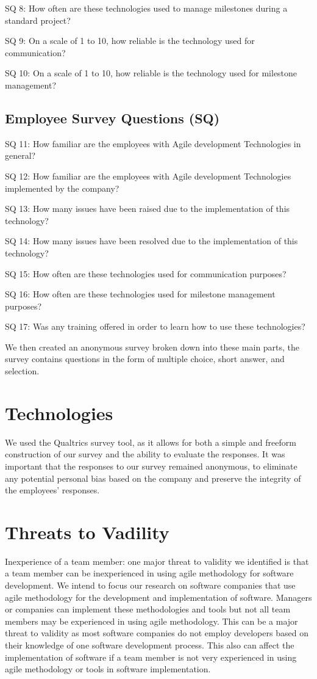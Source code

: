 \documentclass[conference]{IEEEtran}
\begin{document}
SQ 8: How often are these technologies used to manage milestones during a standard project? 

SQ 9: On a scale of 1 to 10, how reliable is the technology used for communication? 

SQ 10: On a scale of 1 to 10, how reliable is the technology used for milestone management? 


\subsection*{Employee Survey Questions (SQ)  }
SQ 11: How familiar are the employees with Agile development Technologies in general? 

SQ 12: How familiar are the employees with Agile development Technologies implemented by the company? 

SQ 13: How many issues have been raised due to the implementation of this technology? 

SQ 14: How many issues have been resolved due to the implementation of this technology? 

SQ 15: How often are these technologies used for communication purposes? 

SQ 16: How often are these technologies used for milestone management purposes? 

SQ 17: Was any training offered in order to learn how to use these technologies?


 

We then created an anonymous survey broken down into these main parts, the survey contains questions in the form of multiple choice, short answer, and selection.  

\section{Technologies}
We used the Qualtrics survey tool, as it allows for both a simple and freeform construction of our survey and the ability to evaluate the responses. It was important that the responses to our survey remained anonymous, to eliminate any potential personal bias based on the company and preserve the integrity of the employees' responses. 

\section{Threats to Vadility}

Inexperience of a team member: one major threat to validity we identified is that a team member can be inexperienced in using agile methodology for software development. We intend to focus our research on software companies that use agile methodology for the development and implementation of software. Managers or companies can implement these methodologies and tools but not all team members may be experienced in using agile methodology. This can be a major threat to validity as most software companies do not employ developers based on their knowledge of one software development process.
This also can affect the implementation of software if a team member is not very experienced in using agile methodology or tools in software implementation.
\end{document}
